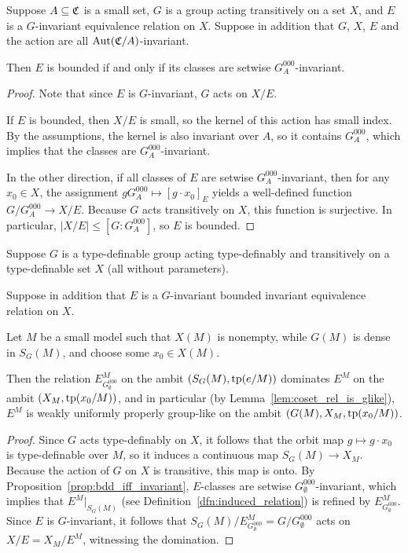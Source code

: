 	\begin{prop}
		\label{prop:bdd_iff_invariant}
		Suppose $A\subseteq {\mathfrak C}$ is a small set, $G$ is a group acting transitively on a set $X$, and $E$ is a $G$-invariant equivalence relation on $X$. Suppose in addition that $G$, $X$, $E$ and the action are all $\operatorname{{Aut}}({\mathfrak C}/A)$-invariant.
		
		Then $E$ is bounded if and only if its classes are setwise $G^{000}_A$-invariant.
	\end{prop}
	\begin{proof}
		Note that since $E$ is $G$-invariant, $G$ acts on $X/E$.
		
		If $E$ is bounded, then $X/E$ is small, so the kernel of this action has small index. By the assumptions, the kernel is also invariant over $A$, so it contains $G^{000}_A$, which implies that the classes are $G^{000}_A$-invariant.
		
		In the other direction, if all classes of $E$ are setwise $G^{000}_A$-invariant, then for any $x_0\in X$, the assignment $gG^{000}_A\mapsto [g\cdot x_0]_E$ yields a well-defined function $G/G^{000}_A\to X/E$. Because $G$ acts transitively on $X$, this function is surjective. In particular, $\lvert X/E\rvert\leq [G:G^{000}_A]$, so $E$ is bounded.
	\end{proof}
	
	
	
	\begin{lem}
		\label{lem:weakly_grouplike_tdf}
		Suppose $G$ is a type-definable group acting type-definably and transitively on a type-definable set $X$ (all without parameters).
		
		Suppose in addition that $E$ is a $G$-invariant bounded invariant equivalence relation on $X$.
		
		Let $M$ be a small model such that $X(M)$ is nonempty, while $G(M)$ is dense in $S_G(M)$, and choose some $x_0\in X(M)$.
		
		Then the relation $E_{G^{000}_\emptyset}^M$ on the ambit $(S_G(M),\operatorname{{tp}}(e/M))$ dominates $E^M$ on the ambit $(X_M,\operatorname{{tp}}(x_0/M))$, and in particular (by Lemma~\ref{lem:coset_rel_is_glike}), $E^M$ is weakly uniformly properly group-like on the ambit $(G(M),X_M,\operatorname{{tp}}(x_0/M))$.
	\end{lem}
	\begin{proof}
		Since $G$ acts type-definably on $X$, it follows that the orbit map $g\mapsto g\cdot x_0$ is type-definable over $M$, so it induces a continuous map $S_G(M)\to X_M$. Because the action of $G$ on $X$ is transitive, this map is onto. By Proposition~\ref{prop:bdd_iff_invariant}, $E$-classes are setwise $G^{000}_\emptyset$-invariant, which implies that $E^M|_{S_G(M)}$ (see Definition~\ref{dfn:induced_relation}) is refined by $E_{G^{000}_\emptyset}^M$. Since $E$ is $G$-invariant, it follows that $S_G(M)/E_{G^{000}_\emptyset}^M=G/G^{000}_\emptyset$ acts on $X/E=X_M/E^M$, witnessing the domination.
	\end{proof}
	
